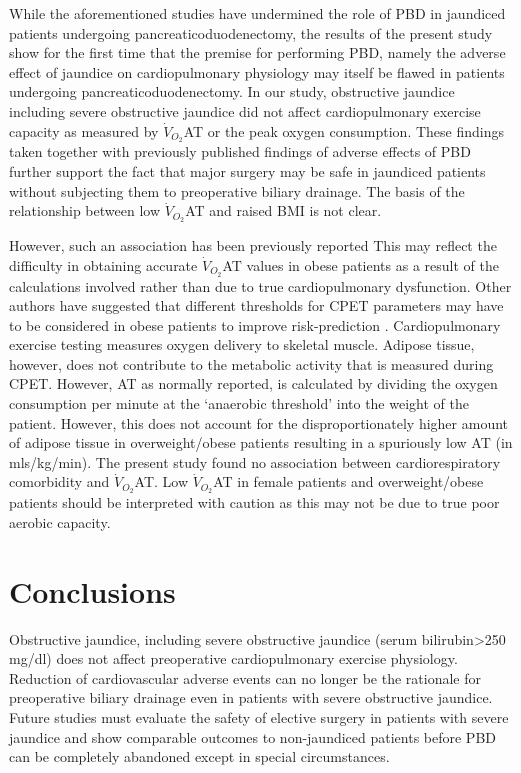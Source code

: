 While the aforementioned studies have undermined the role of PBD in jaundiced patients undergoing pancreaticoduodenectomy, the results of the present study show for the first time that the premise for performing PBD, namely the adverse effect of jaundice on cardiopulmonary physiology may itself be flawed in patients undergoing pancreaticoduodenectomy. In our study, obstructive jaundice including severe obstructive jaundice did not affect cardiopulmonary exercise capacity as measured by $\dot{V}_{O_2}$AT or the peak oxygen consumption. These findings taken together with previously published findings of adverse effects of PBD further support the fact that major surgery may be safe in jaundiced patients without subjecting them to preoperative biliary drainage. 
The basis of the relationship between low $\dot{V}_{O_2}$AT and raised BMI is not clear. 

However, such an association has been previously reported \parencite{horwich_relationship_2009}  This may reflect the difficulty in obtaining accurate $\dot{V}_{O_2}$AT values in obese patients as a result of the calculations involved rather than due to true cardiopulmonary dysfunction. Other authors have suggested that different thresholds for CPET parameters may have to be considered in obese patients to improve risk-prediction \parencite{donnelly_criteria_1990,hulens_exercise_2001}. Cardiopulmonary exercise testing measures oxygen delivery to skeletal muscle. Adipose tissue, however, does not contribute to the metabolic activity that is measured during CPET. However, AT as normally reported, is calculated by dividing the oxygen consumption per minute at the ‘anaerobic threshold' into the weight of the patient. However, this does not account for the disproportionately higher amount of adipose tissue in overweight/obese patients resulting in a spuriously low AT (in mls/kg/min). The present study found no association between cardiorespiratory comorbidity and $\dot{V}_{O_2}$AT. Low $\dot{V}_{O_2}$AT in female patients and overweight/obese patients should be interpreted with caution as this may not be due to true poor aerobic capacity.

\section{Conclusions}
Obstructive jaundice, including severe obstructive jaundice (serum bilirubin>250 mg/dl) does not affect preoperative cardiopulmonary exercise physiology. Reduction of cardiovascular adverse events can no longer be the rationale for preoperative biliary drainage even in patients with severe obstructive jaundice. Future studies must evaluate the safety of elective surgery in patients with severe jaundice and show comparable outcomes to non-jaundiced patients before PBD can be completely abandoned except in special circumstances.